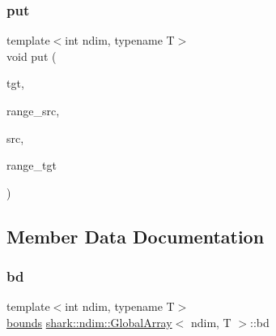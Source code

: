 \hypertarget{classshark_1_1ndim_1_1_global_array_ad96ea2c2b281921d915e7a8834420f06}{}\label{classshark_1_1ndim_1_1_global_array_ad96ea2c2b281921d915e7a8834420f06} 
\subsubsection{\texorpdfstring{put}{put}}
{\footnotesize\ttfamily template$<$int ndim, typename T$>$ \\
void put (\begin{DoxyParamCaption}\item[{\hyperlink{classshark_1_1ndim_1_1_global_array}{Global\+Array}$<$ ndim, T $>$ \&}]{tgt,  }\item[{\hyperlink{structshark_1_1ndim_1_1coords__range}{coords\+\_\+range}$<$ ndim $>$}]{range\+\_\+src,  }\item[{\hyperlink{classshark_1_1ndim_1_1_global_array}{Global\+Array}$<$ ndim, T $>$ \&}]{src,  }\item[{\hyperlink{structshark_1_1ndim_1_1coords__range}{coords\+\_\+range}$<$ ndim $>$}]{range\+\_\+tgt }\end{DoxyParamCaption})\hspace{0.3cm}{\ttfamily [friend]}}



\subsection{Member Data Documentation}
\hypertarget{classshark_1_1ndim_1_1_global_array_aead89700a3d1d960432c6dc971251a9c}{}\label{classshark_1_1ndim_1_1_global_array_aead89700a3d1d960432c6dc971251a9c} 
\subsubsection{\texorpdfstring{bd}{bd}}
{\footnotesize\ttfamily template$<$int ndim, typename T$>$ \\
\hyperlink{classshark_1_1ndim_1_1_global_array_a5376df376a8de6a0a756def884c55864}{bounds} \hyperlink{classshark_1_1ndim_1_1_global_array}{shark\+::ndim\+::\+Global\+Array}$<$ ndim, T $>$\+::bd\hspace{0.3cm}{\ttfamily [private]}}



